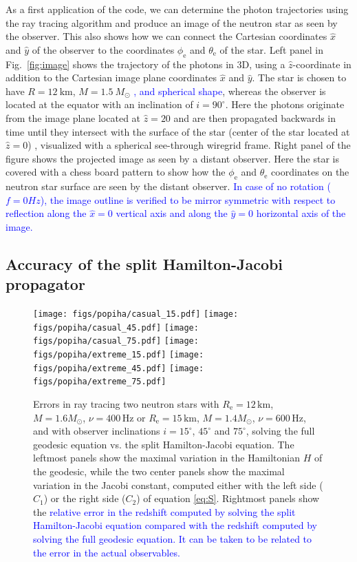 \documentclass{aa}
\newcommand{\refe}[1]{\textcolor{blue}{{#1}}}
\newcommand{\Msun}{\ensuremath{M_{\odot}}}
\begin{document}
As a first application of the code, we can determine the photon trajectories using the ray tracing algorithm and produce an image of the neutron star as seen by the observer.
This also shows how we can connect the Cartesian coordinates $\hat{x}$ and $\hat{y}$ of the observer to the coordinates $\phi_{\mathrm{e}}$ and $\theta_{\mathrm{e}}$ of the star.
Left panel in Fig.~\ref{fig:image} shows the trajectory of the photons in 3D, using a $\hat{z}$-coordinate in addition to the Cartesian image plane coordinates $\hat{x}$ and $\hat{y}$.
The star is chosen to have $R=12~\mathrm{km}$, $M=1.5~\Msun$ \refe{, and spherical shape}, whereas the observer is located at the equator with an inclination of $i = 90^{\circ}$.
Here the photons originate from the image plane located at $\hat{z} = 20$ and are then propagated backwards in time until they intersect with the surface of the star (center of the star located at $\hat{z} = 0$) , visualized with a spherical see-through wiregrid frame.
Right panel of the figure shows the projected image as seen by a distant observer.
Here the star is covered with a chess board pattern to show how the $\phi_{\mathrm{e}}$ and $\theta_{\mathrm{e}}$ coordinates on the neutron star surface are seen by the distant observer.
\refe{In case of no rotation ($f = 0 Hz$), the image outline is verified to be mirror symmetric with respect to reflection along the $\hat{x} = 0$ vertical axis and along the $\hat{y} = 0$ horizontal axis of the image.}


\subsection{Accuracy of the split Hamilton-Jacobi propagator}

\begin{figure}[htbp!]
\centering
\texttt{[image: figs/popiha/casual\_15.pdf]}
\texttt{[image: figs/popiha/casual\_45.pdf]}
\texttt{[image: figs/popiha/casual\_75.pdf]}
\texttt{[image: figs/popiha/extreme\_15.pdf]}
\texttt{[image: figs/popiha/extreme\_45.pdf]}
\texttt{[image: figs/popiha/extreme\_75.pdf]}
\caption{\label{fig:H_C1_C2}
    Errors in ray tracing two neutron stars with $R_{\mathrm{e}}=12\,\mathrm{km}$, $M=1.6\Msun$, $\nu=400\,\mathrm{Hz}$ or $R_{\mathrm{e}}=15\,\mathrm{km}$, $M=1.4\Msun$, $\nu=600\,\mathrm{Hz}$, and with observer inclinations $i=15^\circ$, $45^\circ$ and $75^\circ$, solving the full geodesic equation vs. the split Hamilton-Jacobi equation.
    The leftmost panels show the maximal variation in the Hamiltonian $H$ of the geodesic, while the two center panels show the maximal variation in the Jacobi constant, computed either with the left side ($C_1$) or the right side ($C_2$) of equation \eqref{eq:S}.
    Rightmost panels show the \refe{relative error in the redshift computed by solving the split Hamilton-Jacobi equation compared with the redshift computed by solving the full geodesic equation.}
    \refe{It can be taken to be related to the error in the actual observables.}
}
\end{figure}
\end{document}
